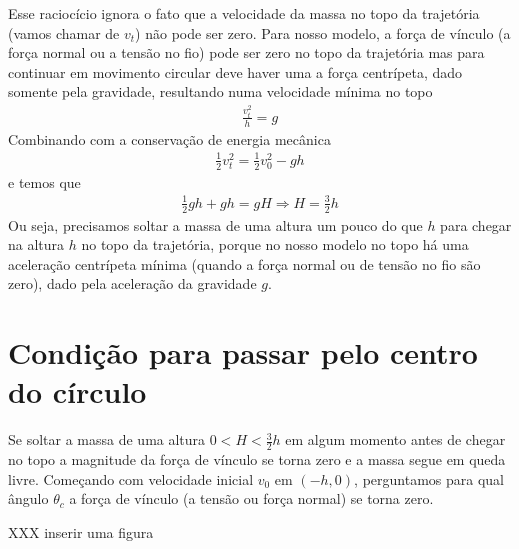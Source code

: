 \documentclass[letterpaper,10pt,english]{jupyterBook}
\begin{document}
\sphinxAtStartPar
Esse raciocício ignora o fato que a velocidade da massa no topo da trajetória (vamos chamar de \(v_t\)) não pode ser zero. Para nosso modelo, a força de vínculo (a força normal ou a tensão no fio) pode ser zero no topo da trajetória mas para continuar em movimento circular deve haver uma a força centrípeta, dado somente pela gravidade, resultando numa velocidade mínima no topo
\begin{equation*}
\begin{split} \frac{v_t^2}{h} = g \end{split}
\end{equation*}
\sphinxAtStartPar
Combinando com a conservação de energia mecânica
\begin{equation*}
\begin{split} \frac{1}{2}v_{t}^2 = \frac{1}{2}v_0^2 - gh \end{split}
\end{equation*}
\sphinxAtStartPar
e temos que
\begin{equation*}
\begin{split} \frac{1}{2}gh + gh = gH \Rightarrow H = \frac{3}{2} h \end{split}
\end{equation*}
\sphinxAtStartPar
Ou seja, precisamos soltar a massa de uma altura um pouco  do que \(h\) para  chegar na altura \(h\) no topo da trajetória, porque no nosso modelo no topo há uma aceleração centrípeta mínima (quando a força normal ou de tensão no fio são zero), dado pela aceleração da gravidade \(g\).


\section{Condição para  passar pelo centro do círculo}
\label{\detokenize{modelo:condicao-para-justamente-passar-pelo-centro-do-circulo}}
\sphinxAtStartPar
Se soltar a massa de uma altura \(0 < H <  \frac{3}{2}h \) em algum momento antes de chegar no topo a magnitude da força de vínculo se torna zero e a massa segue em queda livre. Começando com velocidade inicial \(v_0\) em \((-h,0)\), perguntamos para qual ângulo \(\theta_c\) a força de vínculo (a tensão ou força normal) se torna zero.

\sphinxAtStartPar
XXX inserir uma figura
\end{document}
